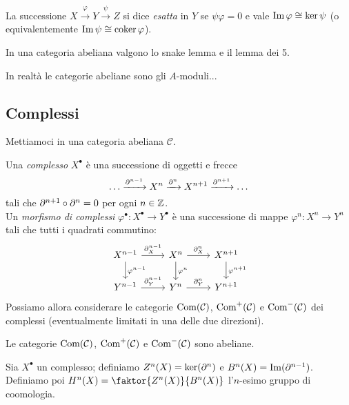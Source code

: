 \begin{definition}
    La successione $X\xrightarrow{\varphi} Y \xrightarrow{\psi} Z$ si dice \emph{esatta} in $Y$ se $\psi\varphi=0$ e vale $\operatorname{Im}\varphi\cong \ker\psi$ (o equivalentemente $\operatorname{Im}\psi\cong\operatorname{coker}\varphi$).
\end{definition}

\begin{proposition}
    In una categoria abeliana valgono lo snake lemma e il lemma dei 5.
\end{proposition}

\begin{theorem}
    In realtà le categorie abeliane sono gli $A$-moduli...
\end{theorem}

\subsection{Complessi}
Mettiamoci in una categoria abeliana $\mathcal{C}$.

\begin{definition}
    Una \emph{complesso} $X^\bullet$ è una successione di oggetti e frecce $$ \dots\xrightarrow{\partial^{n-1}} X^n \xrightarrow{\partial^{n}} X^{n+1} \xrightarrow{\partial^{n+1}}\dots $$
    tali che $\partial^{n+1}\circ\partial^n = 0$ per ogni $n\in\mathbb{Z}$.\\
    Un \emph{morfismo di complessi} $\varphi^\bullet:X^\bullet\to Y^\bullet$ è una successione di mappe $\varphi^n:X^n\to Y^n$ tali che tutti i quadrati commutino:
    $$\begin{tikzcd}
    X^{n-1} \ar[r,"\de_X^{n-1}"] \ar[d,"\varphi^{n-1}"] & X^{n} \ar[r,"\de_X^{n}"] \ar[d,"\varphi^{n}"] & X^{n+1} \ar[d,"\varphi^{n+1}"] \\
    Y^{n-1} \ar[r,"\de_Y^{n-1}"] & Y^{n} \ar[r,"\de_Y^{n}"] & Y^{n+1}
    \end{tikzcd}$$
    Possiamo allora considerare le categorie $\operatorname{Com}(\mathcal{C})$, $\operatorname{Com}^+(\mathcal{C})$ e $\operatorname{Com}^-(\mathcal{C})$ dei complessi (eventualmente limitati in una delle due direzioni).
\end{definition}

\begin{proposition}
    Le categorie $\operatorname{Com}(\mathcal{C})$, $\operatorname{Com}^+(\mathcal{C})$ e $\operatorname{Com}^-(\mathcal{C})$ sono abeliane.
\end{proposition}

\begin{definition}
    Sia $X^\bullet$ un complesso; definiamo $Z^n(X)=\ker(\partial^n)$ e $B^n(X)=\operatorname{Im}(\partial^{n-1})$. Definiamo poi $H^n(X)=\faktor{Z^n(X)}{B^n(X)}$ l'$n$-esimo gruppo di coomologia.
\end{definition}

